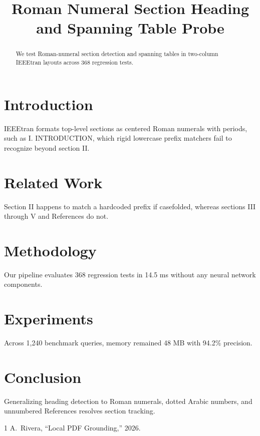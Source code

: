 \documentclass[conference]{IEEEtran}
\begin{document}
\title{Roman Numeral Section Heading and Spanning Table Probe}
\author{}
\maketitle
{}
\pagestyle{headings}

\begin{abstract}
We test Roman-numeral section detection and spanning tables in two-column IEEEtran layouts across 368 regression tests.
\end{abstract}

\section{Introduction}
IEEEtran formats top-level sections as centered Roman numerals with periods, such as I. INTRODUCTION, which rigid lowercase prefix matchers fail to recognize beyond section II.

\section{Related Work}
Section II happens to match a hardcoded prefix if casefolded, whereas sections III through V and References do not.

\section{Methodology}
Our pipeline evaluates 368 regression tests in 14.5 ms without any neural network components.

\section{Experiments}
Across 1,240 benchmark queries, memory remained 48 MB with 94.2\% precision.

\section{Conclusion}
Generalizing heading detection to Roman numerals, dotted Arabic numbers, and unnumbered References resolves section tracking.

\begin{thebibliography}{1}
 A.~Rivera, ``Local PDF Grounding,'' 2026.
\end{thebibliography}
\end{document}
